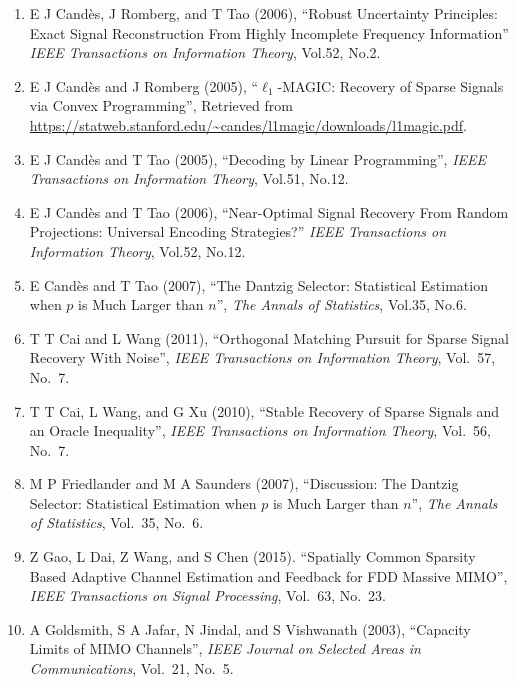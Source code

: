 \documentclass[12pt]{article}
\begin{document}
\begin{enumerate}
\item E J Cand\`es, J Romberg, and T Tao (2006), ``Robust Uncertainty Principles: Exact Signal Reconstruction From Highly Incomplete Frequency Information'' \textit{IEEE Transactions on Information Theory}, Vol.52, No.2.

\item E J Cand\`es and J Romberg (2005), ``\(\ell_1\)-MAGIC: Recovery of Sparse Signals via Convex Programming'', Retrieved from \url{https://statweb.stanford.edu/~candes/l1magic/downloads/l1magic.pdf}.

\item E J Cand\`es and T Tao (2005), ``Decoding by Linear Programming'', \textit{IEEE Transactions on Information Theory}, Vol.51, No.12.

\item E J Cand\`es and T Tao (2006), ``Near-Optimal Signal Recovery From Random Projections: Universal Encoding Strategies?'' \textit{IEEE Transactions on Information Theory}, Vol.52, No.12.

\item E Cand\`es and T Tao (2007), ``The Dantzig Selector: Statistical Estimation when \(p\) is Much Larger than \(n\)'', \textit{The Annals of Statistics}, Vol.35, No.6.

\item T T Cai and L Wang (2011), ``Orthogonal Matching Pursuit for Sparse Signal Recovery With Noise'', \textit{IEEE Transactions on Information Theory}, Vol.\ 57, No.\ 7.

\item T T Cai, L Wang, and G Xu (2010), ``Stable Recovery of Sparse Signals and an Oracle Inequality'', \textit{IEEE Transactions on Information Theory}, Vol.\ 56, No.\ 7.

\item M P Friedlander and M A Saunders (2007), ``Discussion: The Dantzig Selector: Statistical Estimation when \(p\) is Much Larger than \(n\)'', \textit{The Annals of Statistics}, Vol.\ 35, No.\ 6.

\item Z Gao, L Dai, Z Wang, and S Chen (2015). ``Spatially Common Sparsity Based Adaptive Channel Estimation and Feedback for FDD Massive MIMO'', \textit{IEEE Transactions on Signal Processing}, Vol.\ 63, No.\ 23.

\item A Goldsmith, S A Jafar, N Jindal, and S Vishwanath (2003), ``Capacity Limits of MIMO Channels'', \textit{IEEE Journal on Selected Areas in Communications}, Vol.\ 21, No.\ 5.


\end{enumerate}
\end{document}
